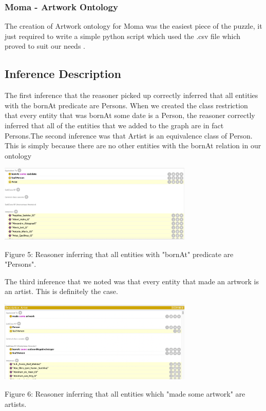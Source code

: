 \documentclass{article}
\begin{document}
\subsubsection{Moma - Artwork Ontology}

The creation of Artwork ontology for Moma was the easiest piece of the puzzle, it just required to write a simple python script which used the .csv file which proved to suit our needs \cite{Sixth_Github}. 

\newpage
\subsection{Inference Description}

The first inference that the reasoner picked up correctly inferred that all entities with the bornAt
predicate are Persons. When we created the class restriction that every entity that was bornAt
some date is a Person, the reasoner correctly inferred that all of the entities that we added to the
graph are in fact Persons.The second inference was that Artist is an equivalence class of Person. This is simply because
there are no other entities with the bornAt relation in our ontology 

\begin{center}
\includegraphics[width=350]{first_inference.png}
\newline
\caption{Figure 5: Reasoner inferring that all entities with "bornAt" predicate are "Persons".}
\end{center}


\newpage
The third inference that we noted was that every entity that made an artwork is an artist. This
is definitely the case.
\begin{center}
\includegraphics[width=350]{second_inferece.png}
\newline
\caption{Figure 6: Reasoner inferring that all entities which "made some artwork" are artists.}
\end{center}
\end{document}
